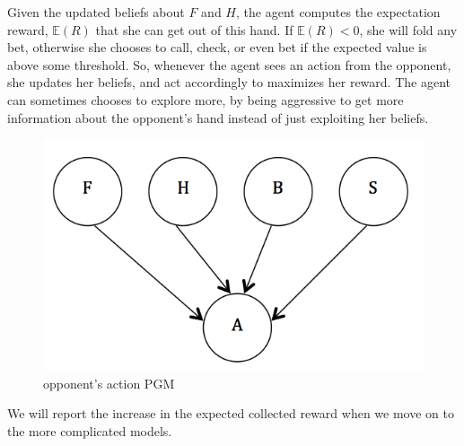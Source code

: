 Given the updated beliefs about $F$ and $H$, the agent computes the expectation reward, 
$\mathbb{E}(R)$ that she can get out of this hand. If $\mathbb{E}(R) <0$, she will
fold any bet, otherwise she chooses to call, check, or even bet if the expected value 
is above some threshold. So, whenever the agent sees an action from the opponent, she
updates her beliefs, and act accordingly to maximizes her reward. The agent can sometimes
chooses to explore more, by being aggressive to get more information about the 
opponent's hand instead of just exploiting her beliefs. 
 
\begin{figure}[h!]
  	\centering
 	\includegraphics[scale = .4]{fig1}
	\caption{opponent's action PGM}
\end{figure}

We will report the increase in the expected collected reward when we move on to the more 
complicated models.